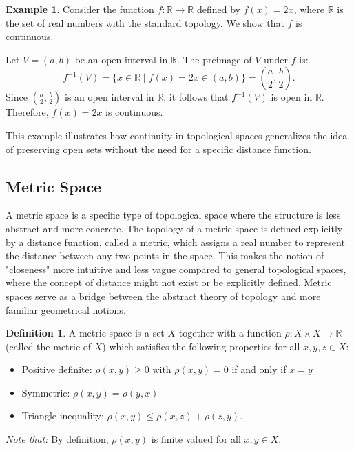 \documentclass[12pt, reqno]{amsart}
\theoremstyle{definition}
\newtheorem{definition}[theorem]{Definition}
\newtheorem{example}[theorem]{Example}
\numberwithin{equation}{section}
\newcommand{\dR}{{\mathbb R}}
\begin{document}
\begin{example}
    Consider the function $f: \dR \to \dR$ defined by $f(x) = 2x$, where $\dR$ is the set of real numbers with the standard topology. We show that $f$ is continuous.

Let $V = (a, b)$ be an open interval in $\dR$. The preimage of $V$ under $f$ is:
\[
f^{-1}(V) = \{x \in \dR \mid f(x) = 2x \in (a, b)\} = \left( \frac{a}{2}, \frac{b}{2} \right).
\]
Since $\left( \frac{a}{2}, \frac{b}{2} \right)$ is an open interval in $\dR$, it follows that $f^{-1}(V)$ is open in $\dR$. Therefore, $f(x) = 2x$ is continuous.
\end{example}
This example illustrates how continuity in topological spaces generalizes the idea of preserving open sets without the need for a specific distance function.




\subsection{Metric Space}
A metric space is a specific type of topological space where the structure is less abstract and more concrete. The topology of a metric space is defined explicitly by a distance function, called a metric, which assigns a real number to represent the distance between any two points in the space. This makes the notion of "closeness" more intuitive and less vague compared to general topological spaces, where the concept of distance might not exist or be explicitly defined. Metric spaces serve as a bridge between the abstract theory of topology and more familiar geometrical notions.
    \begin{definition}
        A metric space is a set $X$ together with a function $\rho: X \times X \longrightarrow \dR$ (called the metric of $X$) which satisfies the following properties for all $x, y, z \in X$:
        \begin{itemize}
            \item {Positive definite: $\rho(x, y) \geq 0$ with $\rho(x, y) = 0$ if and only if $x = y$}
            \item {Symmetric: $\rho(x, y) = \rho(y, x)$}
            \item{Triangle inequality: $\rho(x, y) \leq \rho(x, z)+\rho(z, y)$.}
        \end{itemize}
        \textit{Note that:} By definition, $\rho(x, y)$ is finite valued for all $x, y \in X$.
    \end{definition}
\end{document}
